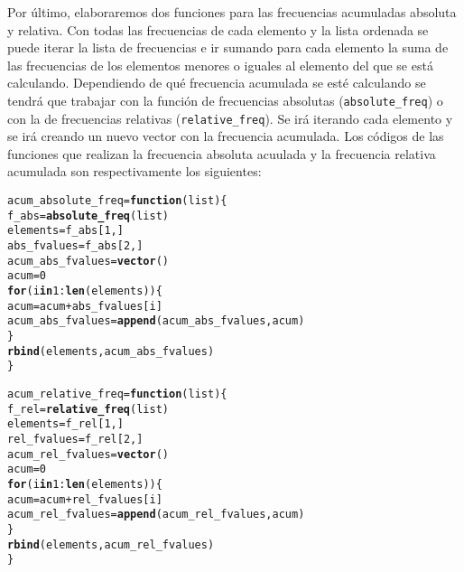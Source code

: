 \documentclass[12pt]{report}\usepackage[]{graphicx}\usepackage[dvipsnames]{xcolor}
\makeatletter
\newcommand{\hlnum}[1]{\textcolor[rgb]{0.686,0.059,0.569}{#1}}%
\newcommand{\hlopt}[1]{\textcolor[rgb]{0,0,0}{#1}}%
\newcommand{\hlstd}[1]{\textcolor[rgb]{0.345,0.345,0.345}{#1}}%
\newcommand{\hlkwa}[1]{\textcolor[rgb]{0.161,0.373,0.58}{\textbf{#1}}}%
\newcommand{\hlkwb}[1]{\textcolor[rgb]{0.69,0.353,0.396}{#1}}%
\newcommand{\hlkwc}[1]{\textcolor[rgb]{0.333,0.667,0.333}{#1}}%
\newcommand{\hlkwd}[1]{\textcolor[rgb]{0.737,0.353,0.396}{\textbf{#1}}}%
\newenvironment{kframe}{%
 \def\at@end@of@kframe{}%
 \ifinner\ifhmode%
  \def\at@end@of@kframe{\end{minipage}}%
  \begin{minipage}{\columnwidth}%
 \fi\fi%
 \def\FrameCommand##1{\hskip\@totalleftmargin \hskip-\fboxsep
 \colorbox{shadecolor}{##1}\hskip-\fboxsep
     \hskip-\linewidth \hskip-\@totalleftmargin \hskip\columnwidth}%
 \MakeFramed {\advance\hsize-\width
   \@totalleftmargin\z@ \linewidth\hsize
   \@setminipage}}%
 {\par\unskip\endMakeFramed%
 \at@end@of@kframe}
\newenvironment{knitrout}{}{} %
\makeatother
\begin{document}
			Por último, elaboraremos dos funciones para las frecuencias acumuladas absoluta y relativa. Con todas las frecuencias de cada elemento y la lista ordenada se puede iterar la lista de frecuencias e ir sumando para cada elemento la suma de las frecuencias de los elementos menores o iguales al elemento del que se está calculando. Dependiendo de qué frecuencia acumulada se esté calculando se tendrá que trabajar con la función de frecuencias absolutas (\texttt{absolute\_freq}) o con la de frecuencias relativas (\texttt{relative\_freq}). Se irá iterando cada elemento y se irá creando un nuevo vector con la frecuencia acumulada. Los códigos de las funciones que realizan la frecuencia absoluta acuulada y la frecuencia relativa acumulada son respectivamente los siguientes:
			
\begin{knitrout}
\color{fgcolor}\begin{kframe}
\begin{alltt}
\hlstd{acum_absolute_freq} \hlkwb{=} \hlkwa{function}\hlstd{(}\hlkwc{list}\hlstd{)\{}
        \hlstd{f_abs} \hlkwb{=} \hlkwd{absolute_freq}\hlstd{(list)}
        \hlstd{elements} \hlkwb{=} \hlstd{f_abs[}\hlnum{1}\hlstd{,]}
        \hlstd{abs_fvalues} \hlkwb{=} \hlstd{f_abs[}\hlnum{2}\hlstd{,]}
        \hlstd{acum_abs_fvalues} \hlkwb{=} \hlkwd{vector}\hlstd{()}
        \hlstd{acum} \hlkwb{=} \hlnum{0}
        \hlkwa{for} \hlstd{(i} \hlkwa{in} \hlnum{1}\hlopt{:}\hlkwd{len}\hlstd{(elements))\{}
                \hlstd{acum} \hlkwb{=} \hlstd{acum} \hlopt{+} \hlstd{abs_fvalues[i]}
                \hlstd{acum_abs_fvalues} \hlkwb{=} \hlkwd{append}\hlstd{(acum_abs_fvalues, acum)}
        \hlstd{\}}
        \hlkwd{rbind}\hlstd{(elements, acum_abs_fvalues)}
\hlstd{\}}
\end{alltt}
\end{kframe}
\end{knitrout}
			
\begin{knitrout}
\color{fgcolor}\begin{kframe}
\begin{alltt}
\hlstd{acum_relative_freq} \hlkwb{=} \hlkwa{function}\hlstd{(}\hlkwc{list}\hlstd{)\{}
        \hlstd{f_rel} \hlkwb{=} \hlkwd{relative_freq}\hlstd{(list)}
        \hlstd{elements} \hlkwb{=} \hlstd{f_rel[}\hlnum{1}\hlstd{,]}
        \hlstd{rel_fvalues} \hlkwb{=} \hlstd{f_rel[}\hlnum{2}\hlstd{,]}
        \hlstd{acum_rel_fvalues} \hlkwb{=} \hlkwd{vector}\hlstd{()}
        \hlstd{acum} \hlkwb{=} \hlnum{0}
        \hlkwa{for} \hlstd{(i} \hlkwa{in} \hlnum{1}\hlopt{:}\hlkwd{len}\hlstd{(elements))\{}
                \hlstd{acum} \hlkwb{=} \hlstd{acum} \hlopt{+} \hlstd{rel_fvalues[i]}
                \hlstd{acum_rel_fvalues} \hlkwb{=} \hlkwd{append}\hlstd{(acum_rel_fvalues, acum)}
        \hlstd{\}}
        \hlkwd{rbind}\hlstd{(elements, acum_rel_fvalues)}
\hlstd{\}}
\end{alltt}
\end{kframe}
\end{knitrout}
			
\end{document}
